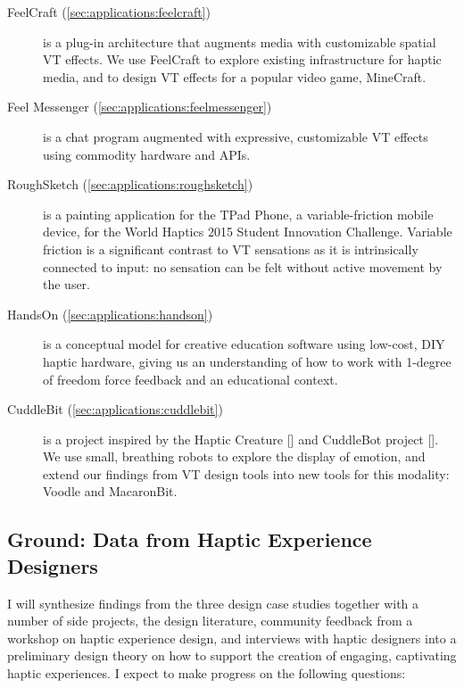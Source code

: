 \begin{description}
	\item[FeelCraft (\autoref{sec:applications:feelcraft})] is a plug-in architecture that augments media with customizable spatial VT effects.
	We use FeelCraft to explore existing infrastructure for haptic media, and to design VT effects for a popular video game, MineCraft.
	
	\item[Feel Messenger (\autoref{sec:applications:feelmessenger})] is a chat program augmented with expressive, customizable VT effects using commodity hardware and APIs.
	
	\item[RoughSketch (\autoref{sec:applications:roughsketch})] is a painting application for the TPad Phone, a variable-friction mobile device, for the World Haptics 2015 Student Innovation Challenge. 
	Variable friction is a significant contrast to VT sensations as it is intrinsically connected to input: no sensation can be felt without active movement by the user.
	
	\item[HandsOn (\autoref{sec:applications:handson})] is a conceptual model for creative education software using low-cost, DIY haptic hardware, giving us an understanding of how to work with 1-degree of freedom force feedback and an educational context.

	\item[CuddleBit (\autoref{sec:applications:cuddlebit})] is a project inspired by the Haptic Creature [] and CuddleBot project [].
	We use small, breathing robots to explore the display of emotion, and extend our findings from VT design tools into new tools for this modality: Voodle and MacaronBit.

\end{description}





\subsection{Ground: Data from Haptic Experience Designers}
I will synthesize findings from the three design case studies together with a number of side projects, the design literature, community feedback from a workshop on haptic experience design, and interviews with haptic designers into a preliminary design theory on how to support the creation of engaging, captivating haptic experiences.
I expect to make progress on the following questions:


